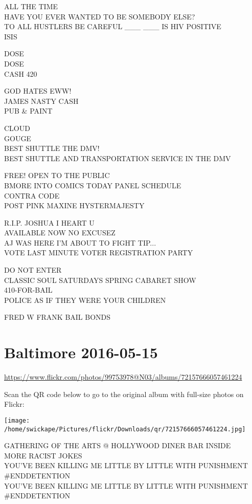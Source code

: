 \documentclass[10pt,letterpaper]{article}
\begin{document}
ALL THE TIME\\
HAVE YOU EVER WANTED TO BE SOMEBODY ELSE?\\
TO ALL HUSTLERS BE CAREFUL \_\_\_ \_\_\_ IS HIV POSITIVE\\
ISIS

DOSE\\
DOSE\\
CASH 420

GOD HATES EWW!\\
JAMES NASTY CASH\\
PUB \& PAINT

CLOUD\\
GOUGE\\
BEST SHUTTLE THE DMV!\\
BEST SHUTTLE AND TRANSPORTATION SERVICE IN THE DMV

FREE!  OPEN TO THE PUBLIC\\
BMORE INTO COMICS TODAY PANEL SCHEDULE\\
CONTRA CODE\\
POST PINK MAXINE HYSTERMAJESTY

R.I.P. JOSHUA I HEART U\\
AVAILABLE NOW NO EXCUSEZ\\
AJ WAS HERE I'M ABOUT TO FIGHT TIP...\\
VOTE LAST MINUTE VOTER REGISTRATION PARTY

DO NOT ENTER\\
CLASSIC SOUL SATURDAYS SPRING CABARET SHOW\\
410{-}FOR{-}BAIL\\
POLICE AS IF THEY WERE YOUR CHILDREN

FRED W FRANK BAIL BONDS
\pagebreak

\section*{Baltimore 2016-05-15}

\url{https://www.flickr.com/photos/99753978@N03/albums/72157666057461224}

Scan the QR code below to go to the original album with full-size photos on Flickr:

\texttt{[image: /home/swickape/Pictures/flickr/Downloads/qr/72157666057461224.jpg]}
\pagebreak

GATHERING OF THE ARTS @ HOLLYWOOD DINER BAR INSIDE\\
MORE RACIST JOKES\\
YOU'VE BEEN KILLING ME LITTLE BY LITTLE WITH PUNISHMENT \#ENDDETENTION\\
YOU'VE BEEN KILLING ME LITTLE BY LITTLE WITH PUNISHMENT \#ENDDETENTION
\end{document}
